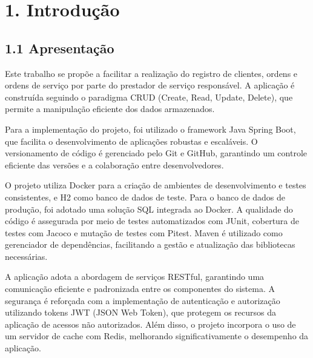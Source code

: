\chapter*{1. Introdução}

\section*{1.1 Apresentação}

Este trabalho se propõe a facilitar a realização  do registro de clientes, ordens e ordens de serviço por parte do prestador de serviço responsável. A aplicação é construída seguindo o paradigma CRUD (Create, Read, Update, Delete), que permite a manipulação eficiente dos dados armazenados.

Para a implementação do projeto, foi utilizado o framework Java Spring Boot, que facilita o desenvolvimento de aplicações robustas e escaláveis. O versionamento de código é gerenciado pelo Git e GitHub, garantindo um controle eficiente das versões e a colaboração entre desenvolvedores.

O projeto utiliza Docker para a criação de ambientes de desenvolvimento e testes consistentes, e H2 como banco de dados de teste. Para o banco de dados de produção, foi adotado uma solução SQL integrada ao Docker. A qualidade do código é assegurada por meio de testes automatizados com JUnit, cobertura de testes com Jacoco e mutação de testes com Pitest. Maven é utilizado como gerenciador de dependências, facilitando a gestão e atualização das bibliotecas necessárias.

A aplicação adota a abordagem de serviços RESTful, garantindo uma comunicação eficiente e padronizada entre os componentes do sistema. A segurança é reforçada com a implementação de autenticação e autorização utilizando tokens JWT (JSON Web Token), que protegem os recursos da aplicação de acessos não autorizados. Além disso, o projeto incorpora o uso de um servidor de cache com Redis, melhorando significativamente o desempenho da aplicação.

